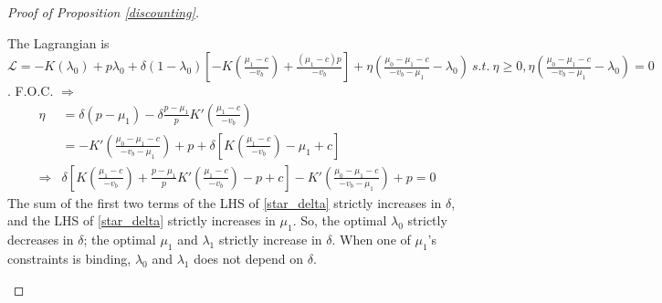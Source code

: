 \documentclass[11pt]{extarticle}
\newcommand{\ra}{\Rightarrow}
\begin{document}
\begin{proof}[Proof of Proposition \ref{discounting}]
\begin{enumerate}[(1)]
		The Lagrangian is $\mathcal{L} = -K(\lambda_0) + p \lambda_0 + \delta (1-\lambda_0) \left[-K(\frac{\mu_1-c}{-v_b})+\frac{(\mu_1-c)p}{-v_b}\right] + \eta \left(\frac{\mu_0-\mu_1-c}{-v_b-\mu_1}-\lambda_0\right)~s.t.~\eta \geq 0, \eta \left(\frac{\mu_0-\mu_1-c}{-v_b-\mu_1}-\lambda_0\right) = 0$. F.O.C. $\ra$
		\begin{align*}
		\eta &= \delta(p-\mu_1)-\delta\frac{p-\mu_1}{p} K'(\frac{\mu_1-c}{-v_b})\\
		&=-K'(\frac{\mu_0-\mu_1-c}{-v_b-\mu_1}) + p + \delta\left[K(\frac{\mu_1-c}{-v_b})-\mu_1+c\right]\\
		\ra&\delta\left[K(\frac{\mu_1-c}{-v_b})+\frac{p-\mu_1}{p} K'(\frac{\mu_1-c}{-v_b})-p+c\right]-K'(\frac{\mu_0-\mu_1-c}{-v_b-\mu_1})+p=0 \tag{$*_\delta$}\label{star_delta}
		\end{align*}
		The sum of the first two terms of the LHS of \eqref{star_delta} strictly increases in $\delta$, and the LHS of \eqref{star_delta} strictly increases in $\mu_1$. So, the optimal $\lambda_0$ strictly decreases in $\delta$; the optimal $\mu_1$ and $\lambda_1$ strictly increase in $\delta$. When one of $\mu_1$'s constraints is binding, $\lambda_0$ and $\lambda_1$ does not depend on $\delta$.
		

\end{enumerate}
\end{proof}
\end{document}

